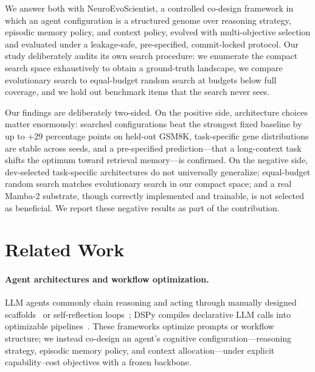\documentclass[11pt]{article}
\begin{document}
We answer both with NeuroEvoScientist, a controlled co-design framework in
which an agent configuration is a structured genome over reasoning strategy,
episodic memory policy, and context policy, evolved with multi-objective
selection and evaluated under a leakage-safe, pre-specified, commit-locked
protocol. Our study deliberately audits its own search procedure: we
enumerate the compact search space exhaustively to obtain a ground-truth
landscape, we compare evolutionary search to equal-budget random search at
budgets below full coverage, and we hold out benchmark items that the search
never sees.

Our findings are deliberately two-sided. On the positive side, architecture
choices matter enormously: searched configurations beat the strongest fixed
baseline by up to +29 percentage points on held-out GSM8K, task-specific
gene distributions are stable across seeds, and a pre-specified
prediction---that a long-context task shifts the optimum toward retrieval
memory---is confirmed. On the negative side, dev-selected task-specific
architectures do not universally generalize; equal-budget random search
matches evolutionary search in our compact space; and a real Mamba-2
substrate, though correctly implemented and trainable, is not selected as
beneficial. We report these negative results as part of the contribution.

\section{Related Work}

\paragraph{Agent architectures and workflow optimization.}
LLM agents commonly chain reasoning and acting through manually designed
scaffolds~\citep{yao2023react,schick2023toolformer} or self-reflection
loops~\citep{shinn2023reflexion}; DSPy compiles declarative LLM calls into
optimizable pipelines~\citep{khattab2023dspy}. These frameworks optimize
prompts or workflow structure; we instead co-design an agent's cognitive
configuration---reasoning strategy, episodic memory policy, and context
allocation---under explicit capability--cost objectives with a frozen
backbone.
\end{document}
